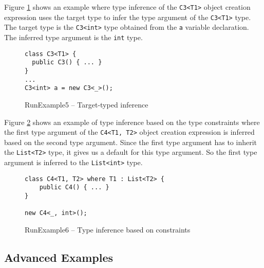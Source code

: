 \par
Figure \ref{img104:example5} shows an example where type inference of the \texttt{C3<T1>} object creation expression uses the target type to infer the type argument of the \texttt{C3<T1>} type.
The target type is the \texttt{C3<int>} type obtained from the \texttt{a} variable declaration.
The inferred type argument is the \texttt{int} type.
\begin{figure}[!h]
\begin{lstlisting}[style=csharp, showstringspaces=false]
class C3<T1> {
  public C3() { ... }
}
...
C3<int> a = new C3<_>();
\end{lstlisting}
\caption{RunExample5 -- Target-typed inference}
\label{img104:example5}
\end{figure}
\par
Figure \ref{img105:example6} shows an example of type inference based on the type constraints where the first type argument of the \texttt{C4<T1, T2>} object creation expression is inferred based on the second type argument.
Since the first type argument has to inherit the \texttt{List<T2>} type, it gives us a default for this type argument.
So the first type argument is inferred to the \texttt{List<int>} type. 
\begin{figure}[!h]
\begin{lstlisting}[style=csharp, showstringspaces=false]
class C4<T1, T2> where T1 : List<T2> {
    public C4() { ... }
}
    
new C4<_, int>();
\end{lstlisting}
\caption{RunExample6 -- Type inference based on constraints}
\label{img105:example6}
\end{figure}

\newpage

\subsection{Advanced Examples}

